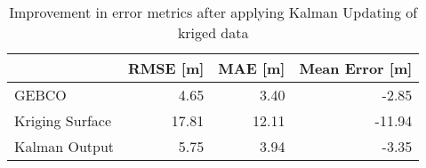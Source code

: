 \begin{table}
\centering
\caption{Improvement in error metrics after applying Kalman Updating of kriged data}
\label{tab:oahu7_gebco_raster_error}
\begin{tabular}{lrrr}
\toprule
 & RMSE [m] & MAE [m] & Mean Error [m] \\
\midrule
GEBCO & 4.65 & 3.40 & -2.85 \\
Kriging Surface & 17.81 & 12.11 & -11.94 \\
Kalman Output & 5.75 & 3.94 & -3.35 \\
\bottomrule
\end{tabular}
\end{table}
